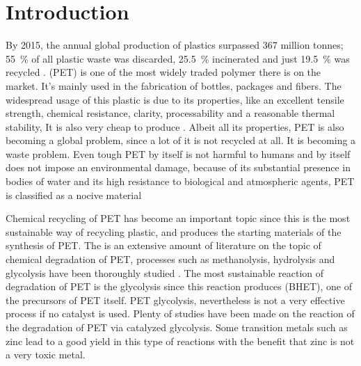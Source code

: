 \section{Introduction}

By 2015, the annual global production of plastics surpassed 367 million tonnes; \SI{55}{\percent} of all plastic waste was discarded, \SI{25.5}{\percent} incinerated and just \SI{19.5}{\percent} was recycled \cite{Geyer2017}.  (PET) is one of the most widely traded polymer there is on the market. It's mainly used in the fabrication of bottles, packages and fibers. The widespread usage of this plastic is due to its properties, like an excellent tensile strength, chemical resistance, clarity, processability and a reasonable thermal stability, It is also very cheap to produce \cite{Caldicott1999,Thompson2009}. Albeit all its properties, PET is also becoming a global problem, since a lot of it is not recycled at all. It is becoming a waste problem. Even tough PET by itself is not harmful to humans and by itself does not impose an environmental damage, because of its substantial presence in bodies of water and its high resistance to biological and atmospheric agents, PET is classified as a nocive material \cite{Paszun1997}

Chemical recycling of PET has become an important topic since this is the most sustainable way of recycling plastic, and produces  the starting materials of the synthesis of PET. The is an extensive amount of literature on the topic of chemical degradation of PET, processes such as methanolysis, hydrolysis and glycolysis have been thoroughly  studied \cite{Campanelli1993,Campanelli1994,Campanelli1994a}. The most sustainable reaction of degradation of PET is the glycolysis since this reaction produces  (BHET), one of the precursors of PET itself. PET glycolysis, nevertheless is not a very effective process if no catalyst is used. Plenty of studies have been made on the reaction of the degradation of PET via catalyzed glycolysis. Some transition metals such as zinc lead to a good yield in this type of reactions with the benefit that zinc is not a very toxic metal.

